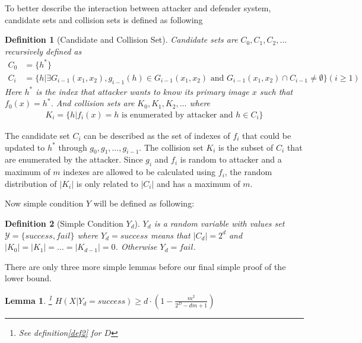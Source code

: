 \documentclass[10pt,a4paper]{article}
\newtheorem{mydef}{Definition}
\newtheorem{mylemma}{Lemma}
\begin{document}
		To better describe the interaction between attacker and defender
		system, candidate sets and collision sets is defined as following
		\begin{mydef}[Candidate and Collision Set]
			Candidate sets are $C_0, C_1, C_2, \ldots$ recursively defined as
			\begin{align*}
				C_0 &= \{h^*\}\\
				C_i &= \{h | \exists G_{i-1}(x_1, x_2),
					g_{i-1}(h) \in G_{i-1}(x_1, x_2) \text{ and } 
					G_{i-1}(x_1, x_2) \cap C_{i-1} \neq \emptyset \} (i \geq 1)
			\end{align*}
			Here $h^*$ is the index that attacker wants to know its primary image
			$x$ such that $f_0(x) = h^*$. And collision sets are $K_0, K_1, K_2, \ldots$ where
			\begin{align*}
				K_i = \{h | f_i(x) = h \text{ is enumerated by attacker and } h \in C_i \}
			\end{align*}
		\end{mydef}
		
		The candidate set $C_i$ can be described as the set of indexes of $f_i$ that could be
		updated to $h^*$ through $g_0, g_1, \ldots, g_{i-1}$. The collision set $K_i$ is the
		subset of $C_i$ that are enumerated by the attacker. Since $g_i$ and $f_i$ is random
		to attacker and a maximum of $m$ indexes are allowed to be calculated using $f_i$, 
		the random distribution of $|K_i|$ is only related to $|C_i|$ and has a maximum
		of $m$. 
		
		Now simple condition $Y$ will be defined as following:
		\begin{mydef}[Simple Condition $Y_d$]
			$Y_d$ is a random variable with values set
			$\mathcal Y = \{ success, fail \}$ where
			$Y_d = success$ means that $|C_d| = 2^d$
			and $|K_0| = |K_1| = \ldots = |K_{d-1}| = 0$.
			Otherwise $Y_d = fail$.
		\end{mydef}
		
		There are only three more simple lemmas before our final simple proof
		of the lower bound.
		
		\begin{mylemma}\label{lem1}\footnote{See definition\ref{def2} for $D$}
			$H(X|Y_d = success) \geq d \cdot (1-\frac{m^2}{2^D-dm+1})$
		\end{mylemma}
		
\end{document}
